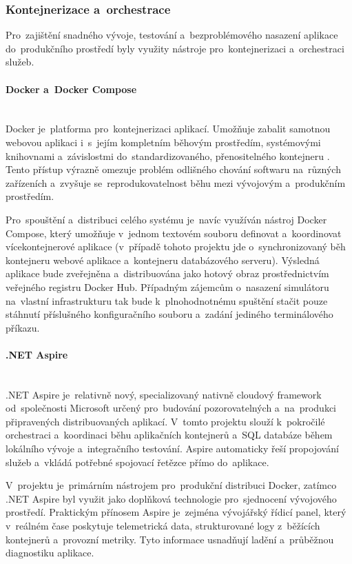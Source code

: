 \documentclass[
  master,
  program=ainfvs,
  printversion,
  figures=false,
  tables=false,
  glossaries,
  index
]{kidiplom}
\begin{document}
\subsubsection{Kontejnerizace a~orchestrace}
Pro~zajištění snadného vývoje, testování a~bezproblémového nasazení aplikace do~produkčního prostředí byly využity nástroje pro~kontejnerizaci a~orchestraci služeb.

\paragraph{Docker a~Docker Compose} \mbox{} \\
Docker je~platforma pro~kontejnerizaci aplikací. Umožňuje zabalit samotnou webovou aplikaci i~s~jejím kompletním běhovým prostředím, systémovými knihovnami a~závislostmi do~standardizovaného, přenositelného kontejneru \cite{docker_docs}. Ten\-to přístup výrazně omezuje problém odlišného chování softwaru na~různých zařízeních a~zvyšuje se~reprodukovatelnost běhu mezi vývojovým a~produkčním prostředím.

Pro~spouštění a~distribuci celého systému je~navíc využíván nástroj Docker Compose, který umožňuje v~jednom textovém souboru definovat a~koordinovat vícekontejnerové aplikace (v~případě tohoto projektu jde o~synchronizovaný běh kontejneru webové aplikace a~kontejneru databázového serveru). Výsledná aplikace bude zveřejněna a~distribuována jako hotový obraz prostřednictvím veřejného registru Docker Hub. Případným zájemcům o~nasazení simulátoru na~vlastní infrastrukturu tak bude k~plnohodnotnému spuštění stačit pouze stáhnutí příslušného konfiguračního souboru a~zadání jediného terminálového příkazu.

\paragraph{.NET Aspire} \mbox{} \\ \label{par:aspire}
.NET Aspire je~relativně nový, specializovaný nativně cloudový framework od~společnosti Microsoft určený pro~budování pozorovatelných a~na~produkci připravených distribuovaných aplikací. V~tomto projektu slouží k~pokročilé orchestraci a~koordinaci běhu aplikačních kontejnerů a~SQL databáze během lokálního vývoje a~integračního testování. Aspire automaticky řeší propojování služeb a~vkládá potřebné spojovací řetězce přímo do~aplikace.

V~projektu je~primárním nástrojem pro~produkční distribuci Docker, zatímco .NET Aspire byl využit jako doplňková technologie pro~sjednocení vývojového prostředí. Praktickým přínosem Aspire je~zejména vývojářský řídicí panel, který v~reálném čase poskytuje telemetrická data, strukturované logy z~běžících kontejnerů a~provozní metriky. Tyto informace usnadňují ladění a~průběžnou diagnostiku aplikace.
\end{document}
